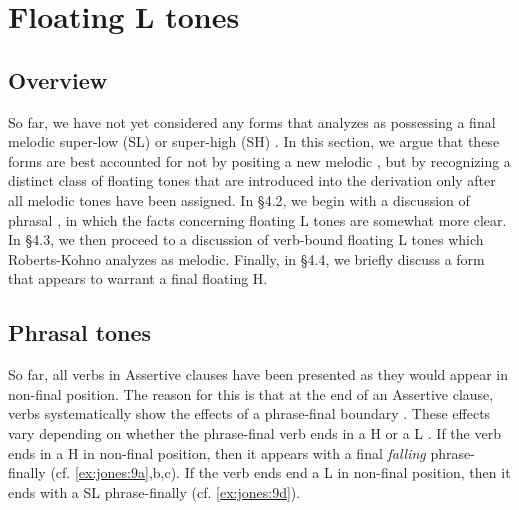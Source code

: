 \documentclass[output=paper
,newtxmath
,modfonts
,nonflat]{langsci/langscibook}
\begin{document}
\section{Floating L tones}
\label{bkm:Ref359187129}\subsection{Overview}

So far, we have not yet considered any forms that \citet{Roberts-Kohno2014} analyzes as possessing a final melodic super-low (SL) or super-high (SH) . In this section, we argue that these forms are best accounted for not by positing a new melodic , but by recognizing a distinct class of floating tones that are introduced into the derivation only after all melodic tones have been assigned. In §4.2, we begin with a discussion of phrasal , in which the facts concerning floating L tones are somewhat more clear. In §4.3, we then proceed to a discussion of verb-bound floating L tones which Roberts-Kohno analyzes as melodic. Finally, in §4.4, we briefly discuss a form that appears to warrant a final floating H.

\subsection{Phrasal tones}
\label{bkm:Ref359196228}
So far, all verbs in Assertive clauses have been presented as they would appear in non-final position. The reason for this is that at the end of an Assertive clause, verbs systematically show the effects of a phrase-final boundary . These effects vary depending on whether the phrase-final verb ends in a H  or a L . If the verb ends in a H  in non-final position, then it appears with a final \textit{falling}  phrase-finally (cf. \ref{ex:jones:9a},b,c). If the verb ends end a L  in non-final position, then it ends with a SL  phrase-finally (cf. \ref{ex:jones:9d}).
\end{document}
